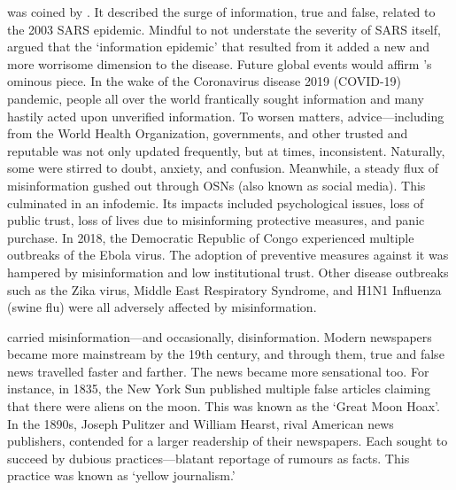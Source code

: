  was coined by . It described the surge of information, true and false, related to the 2003 SARS epidemic. Mindful to not understate the severity of SARS itself, \citeauthor{Rothkopf:2003} argued that the `information epidemic' that resulted from it added a new and more worrisome dimension to the disease. Future global events would affirm \citeauthor{Rothkopf:2003}'s ominous piece. In the wake of the Coronavirus disease 2019 (COVID-19) pandemic, people all over the world frantically sought information and many hastily acted upon unverified information. To worsen matters, advice—including from the World Health Organization, governments, and other trusted and reputable was not only updated frequently, but at times, inconsistent. Naturally, some were stirred to doubt, anxiety, and confusion. Meanwhile, a steady flux of misinformation gushed out through \acp{OSN} (also known as social media). This culminated in an infodemic. Its impacts included psychological issues, loss of public trust, loss of lives due to misinforming protective measures, and panic purchase. In 2018, the Democratic Republic of Congo experienced multiple outbreaks of the Ebola virus. The adoption of preventive measures against it was hampered by misinformation and low institutional trust. Other disease outbreaks such as the Zika virus, Middle East Respiratory Syndrome, and H1N1 Influenza (swine flu) were all adversely affected by misinformation.

 carried misinformation—and occasionally, disinformation. Modern newspapers became more mainstream by the 19th century, and through them, true and false news travelled faster and farther. The news became more sensational too. For instance, in 1835, the New York Sun published multiple false articles claiming that there were aliens on the moon. This was known as the `Great Moon Hoax'. In the 1890s, Joseph Pulitzer and William Hearst, rival American news publishers, contended for a larger readership of their newspapers. Each sought to succeed by dubious practices—blatant reportage of rumours as facts. This practice was known as `yellow journalism.'

